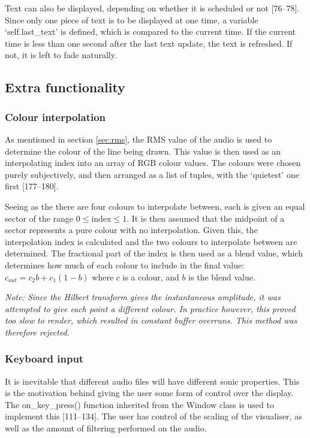 \documentclass[11pt]{article}
\begin{document}
Text can also be displayed, depending on whether it is scheduled or not [76--78]. Since only one piece of text is to be displayed at one time, a variable `self.last\_text' is defined, which is compared to the current time. If the current time is less than one second after the last text update, the text is refreshed. If not, it is left to fade naturally. 

\subsection{Extra functionality}
\subsubsection{Colour interpolation}
As mentioned in section \ref{sec:rms}, the RMS value of the audio is used to determine the colour of the line being drawn. This value is then used as an interpolating index into an array of RGB colour values. The colours were chosen purely subjectively, and then arranged as a list of tuples, with the `quietest' one first [177--180].

Seeing as the there are four colours to interpolate between, each is given an equal sector of the range $0 \le \textrm{index} \le 1$. It is then assumed that the midpoint of a sector represents a pure colour with no interpolation. Given this, the interpolation index is calculated and the two colours to interpolate between are determined. The fractional part of the index is then used as a blend value, which determines how much of each colour to include in the final value: $c_{out} = c_2b+c_1(1-b)$ where $c$ is a colour, and $b$ is the blend value.

\emph{Note: Since the Hilbert transform gives the instantaneous amplitude, it was attempted to give each point a different colour. In practice however, this proved too slow to render, which resulted in constant buffer overruns. This method was therefore rejected.} 

\subsubsection{Keyboard input}
It is inevitable that different audio files will have different sonic properties. This is the motivation behind giving the user some form of control over the display. The on\_key\_press() function inherited from the Window class is used to implement this [111--134]. The user has control of the scaling of the visualiser, as well as the amount of filtering performed on the audio.
\end{document}
